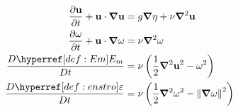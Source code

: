 \begin{subequations}
\begin{align}
\dpr{\vec{u}}{t}
+ \vec{u}\cdot \grad \vec{u}
	&=
	g \vec{\nabla} \eta
	+
	\nu  \vec{\nabla}^{2} \vec{u}
	  \label{eq:NS5} \\
	 \addtocounter{equation}{+1}
	\dpr{\omega}{t}
	+\vec{u}\cdot \grad \omega
	&=
	\nu \grad^2 \omega
	\label{eq:vort5}\\
	 \addtocounter{equation}{+1}
	\frac{D \Em}{D t}
	&=
	\nu \left(\frac{1}{2}	\grad^2 \vec{u}^2 - \omega^2 \right)
	\label{eq:Emech5}\\
	\frac{D \enstro}{D t}
	&=
	\nu \left(\frac{1}{2}	\grad^2 \omega^2 - \norm{\grad \omega}^2 \right)
	\label{eq:enst5}
\end{align}
\end{subequations}

